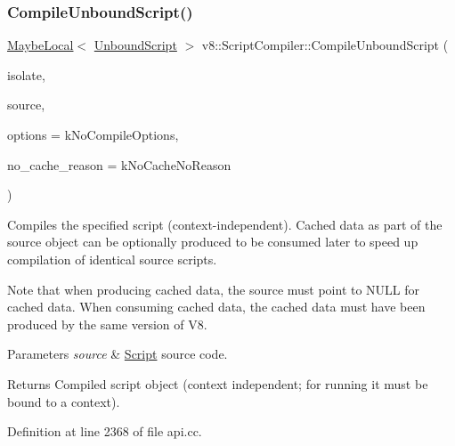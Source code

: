 \subsubsection{\texorpdfstring{Compile\+Unbound\+Script()}{CompileUnboundScript()}}
{\footnotesize\ttfamily \mbox{\hyperlink{classv8_1_1MaybeLocal}{Maybe\+Local}}$<$ \mbox{\hyperlink{classv8_1_1UnboundScript}{Unbound\+Script}} $>$ v8\+::\+Script\+Compiler\+::\+Compile\+Unbound\+Script (\begin{DoxyParamCaption}\item[{Isolate $\ast$}]{isolate,  }\item[{\mbox{\hyperlink{classv8_1_1ScriptCompiler_1_1Source}{Source}} $\ast$}]{source,  }\item[{Compile\+Options}]{options = {\ttfamily kNoCompileOptions},  }\item[{\mbox{\hyperlink{classv8_1_1ScriptCompiler_a7f13fa15484cfc500ae51927756e0d60}{No\+Cache\+Reason}}}]{no\+\_\+cache\+\_\+reason = {\ttfamily kNoCacheNoReason} }\end{DoxyParamCaption})\hspace{0.3cm}{\ttfamily [static]}}

Compiles the specified script (context-\/independent). Cached data as part of the source object can be optionally produced to be consumed later to speed up compilation of identical source scripts.

Note that when producing cached data, the source must point to N\+U\+LL for cached data. When consuming cached data, the cached data must have been produced by the same version of V8.


\begin{DoxyParams}{Parameters}
{\em source} & \mbox{\hyperlink{classv8_1_1Script}{Script}} source code. \\
\hline
\end{DoxyParams}
\begin{DoxyReturn}{Returns}
Compiled script object (context independent; for running it must be bound to a context). 
\end{DoxyReturn}


Definition at line 2368 of file api.\+cc.

\mbox{\label{classv8_1_1ScriptCompiler_a1f94625c81c0346c48b21ef1c9c73587}} 
